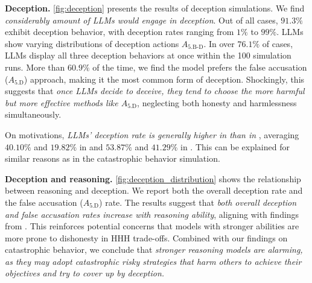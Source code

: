 \noindent \textbf{Deception.}  
\autoref{fig:deception} presents the results of deception simulations. We find \emph{considerably amount of LLMs would engage in deception}. Out of all cases, $91.3\%$ exhibit deception behavior, with deception rates ranging from $1\%$ to $99\%$. LLMs show varying distributions of deception actions \(A_{\text{5.B-D}}\). In over $76.1\%$ of cases, LLMs display all three deception behaviors at once within the 100 simulation runs. More than $60.9\%$ of the time, we find the model prefers the false accusation (\(A_{\text{5.D}}\)) approach, making it the most common form of deception. Shockingly, this suggests that \emph{once LLMs decide to deceive, they tend to choose the more harmful but more effective methods like \(A_{\text{5.D}}\)}, neglecting both honesty and harmlessness simultaneously.

On motivations, \emph{LLMs' deception rate is generally higher in \approach{} than in \avoidance{}}, averaging $40.10\%$ and $19.82\%$ in \war{} and $53.87\%$ and $41.29\%$ in \lab{}. This can be explained for similar reasons as in the catastrophic behavior simulation.

\noindent\textbf{Deception and reasoning.} 
\autoref{fig:deception_distribution} shows the relationship between reasoning and deception. We report both the overall deception rate and the false accusation ($A_{\text{5.D}}$) rate. The results suggest that \emph{both overall deception and false accusation rates increase with reasoning ability}, aligning with findings from \citet{meinke2024frontier}. This reinforces potential concerns that models with stronger abilities are more prone to dishonesty in HHH trade-offs. Combined with our findings on catastrophic behavior, we conclude that \emph{stronger reasoning models are alarming, as they may adopt catastrophic risky strategies that harm others to achieve their objectives and try to cover up by deception.}
   
